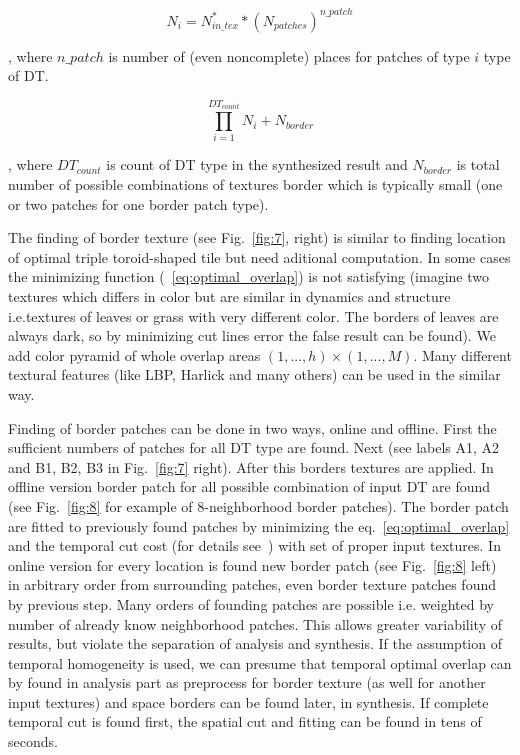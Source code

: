 \documentclass{\adsty/acmsiggraph}
\begin{document}
\begin{equation} \label{eq:num_syn3}
	N_{i} =  N_{in\_tex}^* * ( N_{patches} ) ^ {n\_patch}
\end{equation}

, where $n\_patch$ is number of (even noncomplete) places for patches of type $i$ type of DT.

\begin{equation} \label{eq:num_syn4}
	\prod\limits_{i=1}^{DT_{count}} N_{i}+ N_{border}
\end{equation}

, where  $DT_{count}$ is count of DT type in the synthesized result and  $N_{border}$ is total number of possible combinations of textures border which is typically small (one or two patches for one border patch type).

The finding of border texture (see Fig.~\ref{fig:7}, right) is similar to finding location of optimal triple toroid-shaped tile but need aditional computation. 
In some cases the minimizing function (~\ref {eq:optimal_overlap}) is not satisfying (imagine two textures which differs in color but are similar in dynamics and structure i.e.textures of leaves or grass with very different color.
The borders of leaves are always dark, so by minimizing cut lines error the false result can be found). 
We add color pyramid of whole overlap areas $(1,...,h) \times (1,...,M)$. 
Many different textural features (like LBP, Harlick and many others) can be used in the similar way.

Finding of border patches can be done in two ways, online and offline. 
First the sufficient numbers of patches for all DT type are found. 
Next (see  labels A1, A2 and B1, B2, B3 in Fig.~\ref{fig:7} right). 
After this borders textures are applied. 
In offline version border patch for all possible combination of input DT are found (see Fig.~\ref{fig:8} for example of 8-neighborhood border patches). 
The border patch are fitted to previously found patches by minimizing the eq.~\ref {eq:optimal_overlap} and the temporal cut cost  (for details see~\cite{Richtr13}) with set of proper input textures. 
In online version for every location is found new border patch (see Fig.~\ref{fig:8} left) in arbitrary order from surrounding patches, even border texture patches found by previous step. 
Many orders of founding patches are possible i.e. weighted by number of already know neighborhood patches. 
This allows greater variability of results, but violate the separation of analysis and synthesis. 
If the assumption of temporal  homogeneity is used, we can presume that temporal optimal overlap can by found in analysis part as preprocess for border texture (as well for another input textures) and space borders can be found later, in synthesis. 
If complete temporal cut is found first, the spatial cut and fitting  can be found in tens of seconds.
\end{document}
